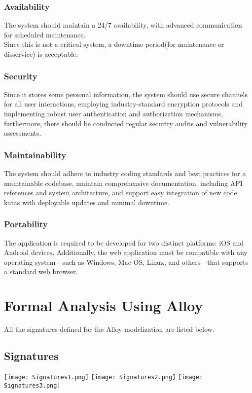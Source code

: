 \documentclass{article}
\begin{document}
\subsubsection{Availability}
The system should maintain a 24/7 availability, with advanced communication for scheduled maintenance.\\
Since this is not a critical system, a downtime period(for maintenance or disservice) is acceptable.

\subsubsection{Security}
Since it stores some personal information, the system should use secure channels for all user interactions, employing industry-standard encryption protocols and implementing robust user authentication and authorization mechanisms, furthermore, there should be conducted regular security audits and vulnerability assessments.

\subsubsection{Maintainability}
The system should adhere to industry coding standards and best practices for a maintainable codebase, maintain comprehensive documentation, including API references and system architecture, and support easy integration of new code katas with deployable updates and minimal downtime.

\subsubsection{Portability}
The application is required to be developed for two distinct platforms: iOS and Android devices. Additionally, the web application must be compatible with any operating system—such as Windows, Mac OS, Linux, and others—that supports a standard web browser.
\newpage
\section{Formal Analysis Using Alloy}
All the signatures defined for the Alloy modelization are listed below.
\subsection{Signatures}
\texttt{[image: Signatures1.png]}
\newpage
\texttt{[image: Signatures2.png]}
\texttt{[image: Signatures3.png]}
\newpage
\end{document}
